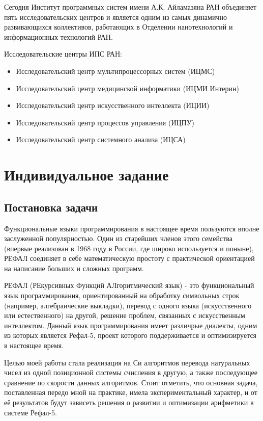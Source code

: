 \documentclass[14pt, russian]{scrartcl}
\begin{document}
Сегодня Институт программных систем имени А.К. Айламазяна РАН объединяет пять исследовательских центров и является одним из самых динамично развивающихся коллективов, работающих в Отделении нанотехнологий и информационных технологий РАН.

Исследовательские центры ИПС РАН:
\begin{itemize}
\item Исследовательский центр мультипроцессорных систем (ИЦМС)
\item Исследовательский центр медицинской информатики (ИЦМИ Интерин)
\item Исследовательский центр искусственного интеллекта (ИЦИИ)
\item Исследовательский центр процессов управления (ИЦПУ)
\item Исследовательский центр системного анализа (ИЦСА)
\end{itemize}
\newpage

\section{Индивидуальное задание}
\subsection{Постановка задачи}
Функциональные языки программирования в настоящее время пользуются вполне заслуженной популярностью. Один из старейших членов этого семейства (впервые реализован в 1968 году в России, где широко используется и поныне), РЕФАЛ соединяет в себе математическую простоту с практической ориентацией на написание больших и сложных программ. ~\cite{Refal5}

РЕФАЛ (РЕкурсивных Функций АЛгоритмический язык) - это функциональный язык программирования, ориентированный на обработку символьных строк (например, алгебраические выкладки), перевод с одного языка (искусственного или естественного) на другой, решение проблем, связанных с искусственным интеллектом. Данный язык программирования имеет различрые диалекты, одним из которых является Рефал-5, проект которого поддерживается и оптимизируется в настоящее время. 

Целью моей работы стала реализация на Си алгоритмов перевода натуральных чисел из одной позиционной системы счисления в другую, а также последующее сравнение по скорости данных алгоритмов. Стоит отметить, что основная задача, поставленная передо мной на практике, имела экспериментальный характер, и от её результатов будут зависеть решения о развитии и оптимизации арифметики в системе Рефал-5.
\end{document}

